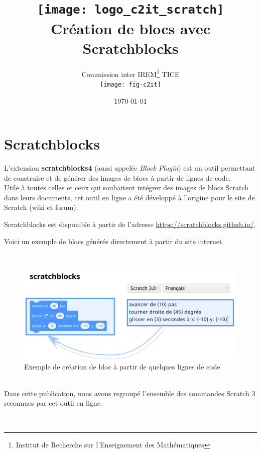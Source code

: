 \documentclass[french,10pt]{article}
\title{%
    \Huge
    \texttt{[image: logo\_c2it\_scratch]}\\[2cm]
    Création de blocs avec Scratchblocks}
\author{%
    Commission inter IREM\footnote{Institut de Recherche sur l'Enseignement des Mathématiques} TICE\\
    \texttt{[image: fig-c2it]}
    }
\date{\today}
\begin{document}
\maketitle
\thispagestyle{empty}

\newpage
\tableofcontents


\newpage

\section{Scratchblocks}


L’extension \textbf{scratchblocks4} (aussi appelée \textit{Block Plugin}) est un outil permettant de construire et de générer des images de blocs à partir de lignes de code.
\\ 
Utile à toutes celles et ceux qui souhaitent intégrer des images de blocs Scratch dans leurs documents, cet outil en ligne a été développé à l’origine pour le site de Scratch (wiki et forum).


Scratchblocks est disponible à partir de l'adresse \url{https://scratchblocks.github.io/}.

Voici un exemple de blocs générés directement à partir du site internet.

~\\

\begin{figure}[h]
    \centering
    \includegraphics[width = 15cm]{res/app.png}
    \caption{Exemple de création de bloc à partir de quelques lignes de code}
    \label{}
\end{figure}

~\\

Dans cette publication, nous avons regroupé l'ensemble des commandes Scratch 3 reconnues par cet outil en ligne.

~\\
\end{document}

